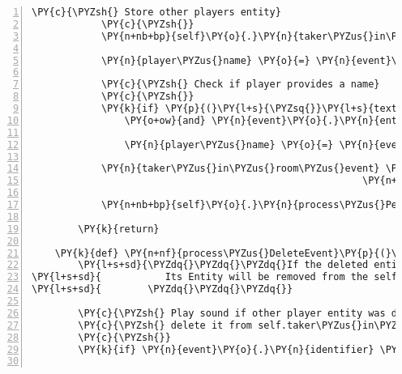 \begin{Verbatim}[commandchars=\\\{\},numbers=left,firstnumber=1,stepnumber=1]
            \PY{c}{\PYZsh{} Store other players entity}
            \PY{c}{\PYZsh{}}
            \PY{n+nb+bp}{self}\PY{o}{.}\PY{n}{taker\PYZus{}in\PYZus{}room\PYZus{}dict}\PY{p}{[}\PY{n}{event}\PY{o}{.}\PY{n}{entity}\PY{o}{.}\PY{n}{identifier}\PY{p}{]} \PY{o}{=} \PY{n}{event}\PY{o}{.}\PY{n}{entity}

            \PY{n}{player\PYZus{}name} \PY{o}{=} \PY{n}{event}\PY{o}{.}\PY{n}{entity}\PY{o}{.}\PY{n}{identifier}

            \PY{c}{\PYZsh{} Check if player provides a name}
            \PY{c}{\PYZsh{}}
            \PY{k}{if} \PY{p}{(}\PY{l+s}{\PYZsq{}}\PY{l+s}{text/plain}\PY{l+s}{\PYZsq{}} \PY{o+ow}{in} \PY{n}{event}\PY{o}{.}\PY{n}{entity}\PY{o}{.}\PY{n}{assets}\PY{o}{.}\PY{n}{keys}\PY{p}{(}\PY{p}{)}
                \PY{o+ow}{and} \PY{n}{event}\PY{o}{.}\PY{n}{entity}\PY{o}{.}\PY{n}{assets}\PY{p}{[}\PY{l+s}{\PYZsq{}}\PY{l+s}{text/plain}\PY{l+s}{\PYZsq{}}\PY{p}{]}\PY{o}{.}\PY{n}{data} \PY{o+ow}{is} \PY{o+ow}{not} \PY{n+nb+bp}{None}\PY{p}{)}\PY{p}{:}

                \PY{n}{player\PYZus{}name} \PY{o}{=} \PY{n}{event}\PY{o}{.}\PY{n}{entity}\PY{o}{.}\PY{n}{assets}\PY{p}{[}\PY{l+s}{\PYZsq{}}\PY{l+s}{text/plain}\PY{l+s}{\PYZsq{}}\PY{p}{]}\PY{o}{.}\PY{n}{data}\PY{p}{[}\PY{l+m+mi}{0}\PY{p}{]}

            \PY{n}{taker\PYZus{}in\PYZus{}room\PYZus{}event} \PY{o}{=} \PY{n}{fabula}\PY{o}{.}\PY{n}{PerceptionEvent}\PY{p}{(}\PY{n+nb+bp}{self}\PY{o}{.}\PY{n}{host}\PY{o}{.}\PY{n}{client\PYZus{}id}\PY{p}{,}
                                                         \PY{n+nb+bp}{self}\PY{o}{.}\PY{n}{taker\PYZus{}in\PYZus{}room\PYZus{}msg}\PY{o}{.}\PY{n}{format}\PY{p}{(}\PY{n}{player\PYZus{}name}\PY{p}{)}\PY{p}{)}

            \PY{n+nb+bp}{self}\PY{o}{.}\PY{n}{process\PYZus{}PerceptionEvent}\PY{p}{(}\PY{n}{taker\PYZus{}in\PYZus{}room\PYZus{}event}\PY{p}{)}

        \PY{k}{return}

    \PY{k}{def} \PY{n+nf}{process\PYZus{}DeleteEvent}\PY{p}{(}\PY{n+nb+bp}{self}\PY{p}{,} \PY{n}{event}\PY{p}{)}\PY{p}{:}
        \PY{l+s+sd}{\PYZdq{}\PYZdq{}\PYZdq{}If the deleted entity is another PLAYER, it will be announced that the player left the room.}
\PY{l+s+sd}{           Its Entity will be removed from the self.taker\PYZus{}in\PYZus{}room\PYZus{}dict.}
\PY{l+s+sd}{        \PYZdq{}\PYZdq{}\PYZdq{}}

        \PY{c}{\PYZsh{} Play sound if other player entity was deleted (left the room) and}
        \PY{c}{\PYZsh{} delete it from self.taker\PYZus{}in\PYZus{}room\PYZus{}dict}
        \PY{c}{\PYZsh{}}
        \PY{k}{if} \PY{n}{event}\PY{o}{.}\PY{n}{identifier} \PY{o+ow}{in} \PY{n+nb+bp}{self}\PY{o}{.}\PY{n}{taker\PYZus{}in\PYZus{}room\PYZus{}dict}\PY{p}{:}


\end{Verbatim}
